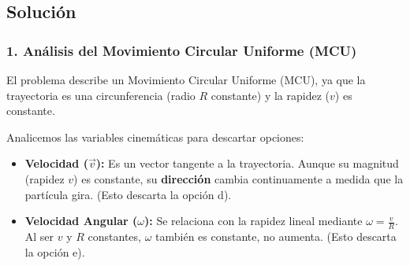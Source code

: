 \documentclass[12pt, a4paper]{article}
\begin{document}
\begin{center}
\end{center}

\subsection*{Solución}

\subsubsection*{1. Análisis del Movimiento Circular Uniforme (MCU)}
El problema describe un Movimiento Circular Uniforme (MCU), ya que la trayectoria es una circunferencia (radio $R$ constante) y la rapidez ($v$) es constante. 

Analicemos las variables cinemáticas para descartar opciones:
\begin{itemize}
    \item \textbf{Velocidad ($\vec{v}$):} Es un vector tangente a la trayectoria. Aunque su magnitud (rapidez $v$) es constante, su \textbf{dirección} cambia continuamente a medida que la partícula gira. (Esto descarta la opción d).
    \item \textbf{Velocidad Angular ($\omega$):} Se relaciona con la rapidez lineal mediante $\omega = \frac{v}{R}$. Al ser $v$ y $R$ constantes, $\omega$ también es constante, no aumenta. (Esto descarta la opción e).
\end{itemize}
\end{document}

